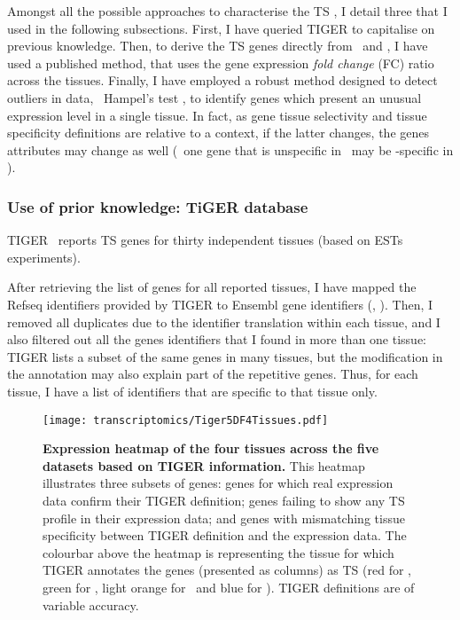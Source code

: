 Amongst all the possible approaches to characterise the \gls{TS} \pcgs,
I detail three that I used in the following subsections.
First, I have queried \gls{TIGER} to capitalise on previous knowledge.
Then, to derive the \gls{TS} genes directly from \setOne\ and \setTwo,
I have used a published method,
that uses the gene expression \emph{fold change} (FC) ratio across the tissues.
Finally, I have employed a robust method designed to detect outliers in data,
\ie\ Hampel's test ,
to identify genes which present an unusual expression level in a single tissue.
In fact, as gene tissue selectivity and tissue specificity definitions are
relative to a context,
if the latter changes,
the genes attributes may change as well
(\eg\ one gene that is unspecific in \setTwo\ may be \heart{}-specific in \setOne).


\subsubsection{Use of prior knowledge: TiGER database}\label{subsub:Tiger}

\gls{TIGER}~ reports \gls{TS} genes for thirty independent tissues
(based on \glspl{EST} experiments).

After retrieving the list of genes for all reported tissues,
I have mapped the \gls{Refseq} identifiers provided by \gls{TIGER}
to \gls{Ensembl} gene identifiers (, ).
Then, I removed all duplicates due to the identifier translation within each tissue,
and I also filtered out all the genes identifiers that
I found in more than one tissue:
\gls{TIGER} lists a subset of the same genes in many tissues,
but the modification in the annotation may also explain part of the
repetitive genes.
Thus, for each tissue,
I have a list of identifiers that are specific to that tissue only.

\begin{figure}[!ht]
    \texttt{[image: transcriptomics/Tiger5DF4Tissues.pdf]}\centering
    \caption[Expression heatmap of the four tissues across the five datasets based on
    TiGER]{\label{fig:TigerGenes}\textbf{Expression heatmap of the four tissues
    across the five datasets based on \gls{TIGER} information.}
    This heatmap illustrates three subsets of genes:
    genes for which real expression data confirm their \gls{TIGER} definition;
    genes failing to show any \gls{TS} profile in their expression data; and
    genes with mismatching tissue specificity between \gls{TIGER}
    definition and the expression data.
    The colourbar above the heatmap is representing the tissue
    for which \gls{TIGER} annotates the genes (presented as columns) as \gls{TS}
    (red for \Heart, green for \kidney, light orange for \liver\ and blue for \testis).
    \gls{TIGER} definitions are of variable accuracy.
    }
\end{figure}

